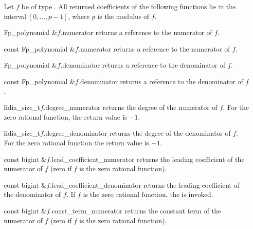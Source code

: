 
\ACCS

Let $f$ be of type .  All returned coefficients of the following
functions lie in the interval $[ 0, \dots, p-1 ]$, where $p$ is the modulus of $f$.

\begin{fcode}{Fp_polynomial &}{$f$.numerator}{}
  returns a reference to the numerator of $f$.
\end{fcode}

\begin{cfcode}{const Fp_polynomial &}{$f$.numerator}{}
  returns a  reference to the numerator of $f$.
\end{cfcode}

\begin{fcode}{Fp_polynomial &}{$f$.denominator}{}
  returns a reference to the denominator of $f$.
\end{fcode}

\begin{cfcode}{const Fp_polynomial &}{$f$.denominator}{}
  returns a  reference to the denominator of $f$.
\end{cfcode}

\begin{cfcode}{lidia_size_t}{$f$.degree_numerator}{}
  returns the degree of the numerator of $f$.  For the zero rational function, the return value
  is $-1$.
\end{cfcode}

\begin{cfcode}{lidia_size_t}{$f$.degree_denominator}{}
  returns the degree of the denominator of $f$.  For the zero rational function the return value
  is $-1$.
\end{cfcode}

\begin{cfcode}{const bigint &}{$f$.lead_coefficient_numerator}{}
  returns the leading coefficient of the numerator of $f$ (zero if $f$ is the zero rational
  function).
\end{cfcode}

\begin{cfcode}{const bigint &}{$f$.lead_coefficient_denominator}{}
  returns the leading coefficient of the denominator of $f$.  If $f$ is the zero rational
  function, the \LEH is invoked.
\end{cfcode}

\begin{cfcode}{const bigint &}{$f$.const_term_numerator}{}
  returns the constant term of the numerator of $f$ (zero if $f$ is the zero rational function).
\end{cfcode}

